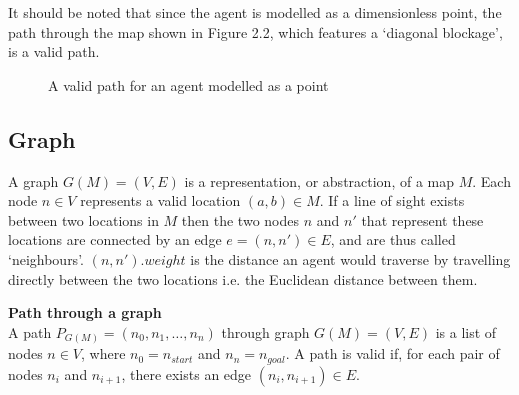 \documentclass[12pt,notitlepage]{report}
\begin{document}
\noindent
It should be noted that since the agent is modelled as a dimensionless point, the path through the map shown in Figure 2.2, which features a `diagonal blockage', is a valid path.\\

\begin{figure}
    \centering
  \caption{A valid path for an agent modelled as a point}
\end{figure}

\subsection{Graph}
A graph $G(M)=(V,E)$ is a representation, or abstraction, of a map $M$. Each node $n \in V$ represents a valid location $(a,b) \in M$. If a line of sight exists between two locations in $M$ then the two nodes $n$ and $n'$ that represent these locations are connected by an edge $e=(n,n') \in E$, and are thus called `neighbours'. $(n,n').weight$ is the distance an agent would traverse by travelling directly between the two locations i.e. the Euclidean distance between them.

\begin{description}
\item{\bfseries Path through a graph}\\
A path $P_{G(M)} = (n_{0}, n_{1}, \ldots, n_{n})$ through graph $G(M)=(V,E)$ is a list of nodes $n \in V$, where $n_{0}=n_{start}$ and $n_{n}=n_{goal}$. A path is valid if, for each pair of nodes $n_{i}$ and $n_{i+1}$, there exists an edge $(n_{i},n_{i+1}) \in E$.\\
\end{description}
\end{document}
